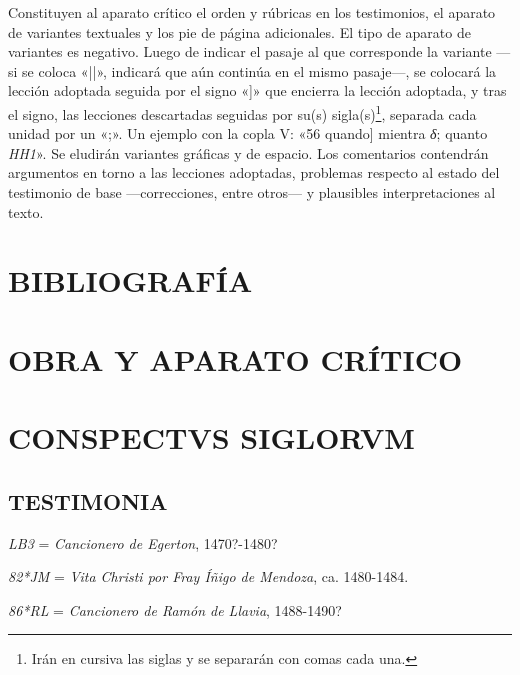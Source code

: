 \documentclass[11pt,a4paper,twoside]{article}
\newcommand{\comillas}[1]{«#1»}
\begin{document}
Constituyen al aparato crítico el orden y rúbricas en los testimonios, el aparato de variantes textuales y los pie de página adicionales. El tipo de aparato de variantes es negativo. Luego de indicar el pasaje al que corresponde la variante —si se coloca \comillas{||}, indicará que aún continúa en el mismo pasaje—, se colocará la lección adoptada seguida por el signo \comillas{]} que encierra la lección adoptada, y tras el signo, las lecciones descartadas seguidas por su(s) sigla(s)\footnote{Irán en cursiva las siglas y se separarán con comas cada una.}, separada cada unidad por un \comillas{;}. Un ejemplo con la copla V: \comillas{56 quando] mientra \textit{δ}; quanto \textit{HH1}}. Se eludirán variantes gráficas y de espacio. Los comentarios contendrán argumentos en torno a las lecciones adoptadas, problemas respecto al estado del testimonio de base —correcciones, entre otros— y plausibles interpretaciones al texto.

\section*{{\fontsize{13}{14.35}\selectfont BIBLIOGRAFÍA}}
\nocite{*}
\printbibliography[heading=none]
\newpage

\section*{\raggedleft \fontsize{13}{14.35}\selectfont OBRA Y APARATO CRÍTICO}
\newpage

\section*{{\fontsize{13}{14.35}\selectfont CONSPECTVS SIGLORVM}}

\subsection*{{\fontsize{11}{11.96}\selectfont TESTIMONIA}}

\textit{LB3} = \textit{Cancionero de Egerton}, 1470?-1480?

\textit{82*JM} = \textit{Vita Christi por Fray Íñigo de Mendoza}, ca. 1480-1484.

\textit{86*RL} = \textit{Cancionero de Ramón de Llavia}, 1488-1490?
\end{document}
